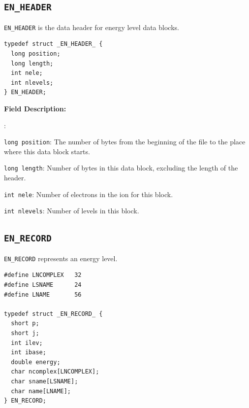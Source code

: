 \documentclass[twoside,letterpaper]{refrep}
\newenvironment{dbdesc}{\textbf{Field Description:} \begin{list}
	{:}{\setlength{\labelwidth}{2in}
	   \setlength{\leftmargin}{2in}
	   \setlength{\labelsep}{0.1in}
	   \setlength{\rightmargin}{0.2in}}}
	{\end{list}}
\begin{document}
\subsection{\texttt{EN\_HEADER}}
\texttt{EN\_HEADER} is the data header for energy level data blocks.

\begin{verbatim}
typedef struct _EN_HEADER_ {
  long position;
  long length;
  int nele;
  int nlevels;
} EN_HEADER;
\end{verbatim}

\begin{dbdesc}
\item[\texttt{long position}:] The number of bytes from the beginning of the
file to the place where this data block starts.
\item[\texttt{long length}:] Number of bytes in this data block, excluding the
length of the header.
\item[\texttt{int nele}:] Number of electrons in the ion for this block.
\item[\texttt{int nlevels}:] Number of levels in this block.
\end{dbdesc}

\subsection{\texttt{EN\_RECORD}}
\texttt{EN\_RECORD} represents an energy level.

\begin{verbatim}
#define LNCOMPLEX   32
#define LSNAME      24
#define LNAME       56

typedef struct _EN_RECORD_ {
  short p;
  short j;
  int ilev;
  int ibase;
  double energy;
  char ncomplex[LNCOMPLEX];
  char sname[LSNAME];
  char name[LNAME];
} EN_RECORD;
\end{verbatim}
\end{document}
